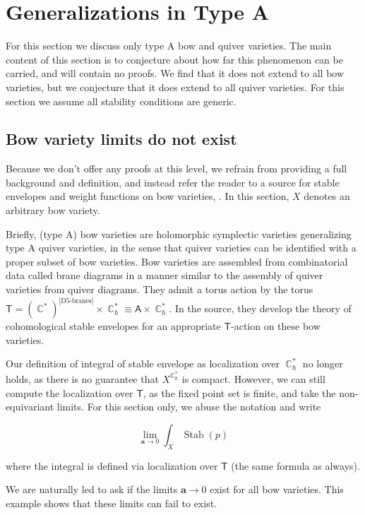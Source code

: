 \documentclass[12 pt]{article}
\theoremstyle{plain}
\theoremstyle{plain}
\theoremstyle{plain}
\theoremstyle{plain}
\theoremstyle{plain}
\theoremstyle{plain}
\theoremstyle{plain}
\theoremstyle{plain}
\theoremstyle{plain}
\theoremstyle{plain}
\theoremstyle{remark}
\theoremstyle{remark}
\theoremstyle{definition}
\theoremstyle{definition}
\theoremstyle{definition}
\theoremstyle{definition}
\theoremstyle{definition}
\theoremstyle{definition}
\DeclareMathOperator{\C}{\mathbb{C}}
\DeclareMathOperator{\Stab}{Stab}
\newcommand{\bT}{\mathsf{T}}
\newcommand{\bA}{\mathsf{A}}
\begin{document}
\section{Generalizations in Type A}\label{sec5}

For this section we discuss only type A bow and quiver varieties. The main content of this section is to conjecture about how far this phenomenon can be carried, and will contain no proofs. We find that it does not extend to all bow varieties, but we conjecture that it does extend to all quiver varieties. For this section we assume all stability conditions are generic. 

\subsection{Bow variety limits do not exist}\label{bows}
Because we don't offer any proofs at this level, we refrain from providing a full background and definition, and instead refer the reader to a source for stable envelopes and weight functions on bow varieties, \cite{rim-shou}. In this section, $X$ denotes an arbitrary bow variety.



Briefly, (type A) bow varieties are holomorphic symplectic varieties generalizing type A quiver varieties, in the sense that quiver varieties can be identified with a proper subset of bow varieties. Bow varieties are assembled from combinatorial data called brane diagrams in a manner similar to the assembly of quiver varieties from quiver diagrams. They admit a torus action by the torus $\bT=(\C^*)^{|\text{D5-branes}|}\times\C^*_\hbar\equiv \bA\times\C^*_\hbar$. In the source, they develop the theory of cohomological stable envelopes for an appropriate $\bT$-action on these bow varieties. 

Our definition of integral of stable envelope as localization over $\C^*_\hbar$ no longer holds, as there is no guarantee that $X^{\C^*_\hbar}$ is compact. However, we can still compute the localization over $\bT$, as the fixed point set is finite, and take the non-equivariant limits. For this section only, we abuse the notation and write 

\[
\lim_{\textbf{a}\to 0}\int_X\Stab(p)
\]

where the integral is defined via localization over $\bT$ (the same formula as always). 

We are naturally led to ask if the limits $\textbf{a}\to 0$ exist for all bow varieties. This example shows that these limits can fail to exist. 
\end{document}

